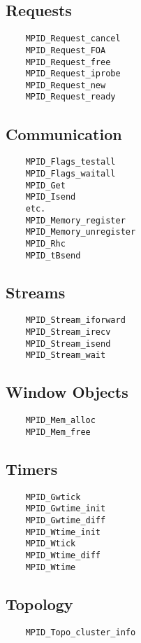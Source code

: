 \documentclass{article}
\begin{document}
\subsection{Requests}
\begin{verbatim}
    MPID_Request_cancel
    MPID_Request_FOA
    MPID_Request_free
    MPID_Request_iprobe
    MPID_Request_new
    MPID_Request_ready
\end{verbatim}

\subsection{Communication}
\begin{verbatim}
    MPID_Flags_testall
    MPID_Flags_waitall
    MPID_Get
    MPID_Isend
    etc.
    MPID_Memory_register
    MPID_Memory_unregister
    MPID_Rhc
    MPID_tBsend
\end{verbatim}

\subsection{Streams}
\begin{verbatim}
    MPID_Stream_iforward
    MPID_Stream_irecv
    MPID_Stream_isend
    MPID_Stream_wait
\end{verbatim}

\subsection{Window Objects}
\begin{verbatim}
    MPID_Mem_alloc
    MPID_Mem_free
\end{verbatim}

\subsection{Timers}
\begin{verbatim}
    MPID_Gwtick
    MPID_Gwtime_init
    MPID_Gwtime_diff
    MPID_Wtime_init
    MPID_Wtick
    MPID_Wtime_diff
    MPID_Wtime
\end{verbatim}

\subsection{Topology}
\begin{verbatim}
    MPID_Topo_cluster_info
\end{verbatim}
\end{document}
